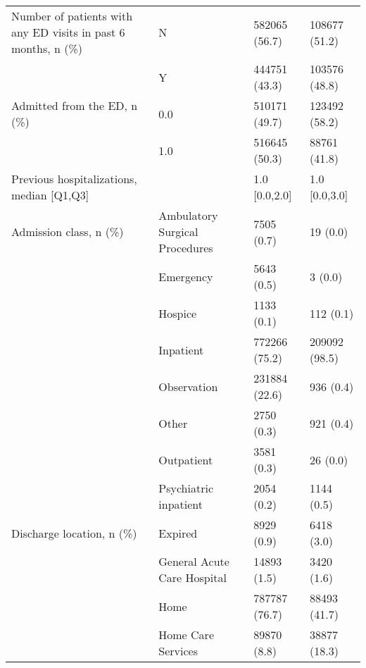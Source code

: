 \begin{tabular}{llll}
Number of patients with any ED visits in past 6 months, n (\%) & N &                         582065 (56.7) &     108677 (51.2) \\
                                       & Y &                         444751 (43.3) &     103576 (48.8) \\
Admitted from the ED, n (\%) & 0.0 &                         510171 (49.7) &     123492 (58.2) \\
                                       & 1.0 &                         516645 (50.3) &      88761 (41.8) \\
Previous hospitalizations, median [Q1,Q3] &   &                         1.0 [0.0,2.0] &     1.0 [0.0,3.0] \\
Admission class, n (\%) & Ambulatory Surgical Procedures &                            7505 (0.7) &          19 (0.0) \\
                                       & Emergency &                            5643 (0.5) &           3 (0.0) \\
                                       & Hospice &                            1133 (0.1) &         112 (0.1) \\
                                       & Inpatient &                         772266 (75.2) &     209092 (98.5) \\
                                       & Observation &                         231884 (22.6) &         936 (0.4) \\
                                       & Other &                            2750 (0.3) &         921 (0.4) \\
                                       & Outpatient &                            3581 (0.3) &          26 (0.0) \\
                                       & Psychiatric inpatient &                            2054 (0.2) &        1144 (0.5) \\
Discharge location, n (\%) & Expired &                            8929 (0.9) &        6418 (3.0) \\
                                       & General Acute Care Hospital &                           14893 (1.5) &        3420 (1.6) \\
                                       & Home &                         787787 (76.7) &      88493 (41.7) \\
                                       & Home Care Services &                           89870 (8.8) &      38877 (18.3) \\

\end{tabular}
